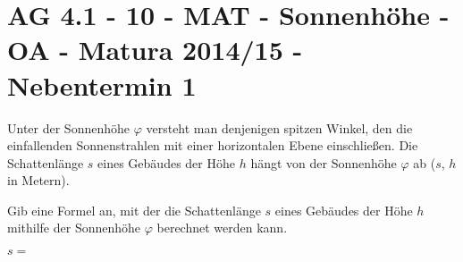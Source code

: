 \section{AG 4.1 - 10 - MAT - Sonnenhöhe - OA - Matura 2014/15 - Nebentermin 1}

\begin{beispiel}[AG 4.1]{1} %
Unter der Sonnenhöhe $\varphi$ versteht man denjenigen spitzen Winkel, den die einfallenden Sonnenstrahlen mit einer horizontalen Ebene einschließen. Die Schattenlänge $s$ eines Gebäudes der Höhe $h$ hängt von der Sonnenhöhe $\varphi$ ab ($s$, $h$ in Metern). \leer

Gib eine Formel an, mit der die Schattenlänge $s$ eines Gebäudes der Höhe $h$ mithilfe der Sonnenhöhe $\varphi$ berechnet werden kann. \leer

$s=$ 
\end{beispiel}